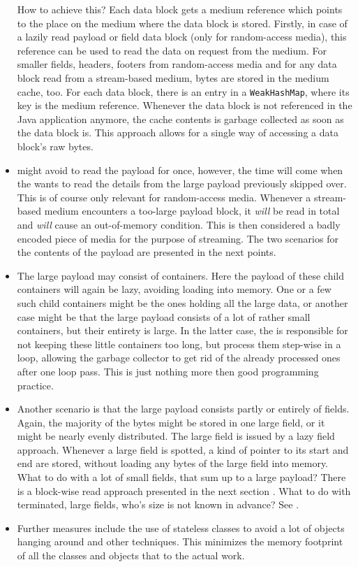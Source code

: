 \begin{itemize}
	How to achieve this? Each data block gets a medium reference which points to the place on the medium where the data block is stored. Firstly, in case of a lazily read payload or field data block (only for random-access media), this reference can be used to read the data on \ACTORuser{} request from the medium. For smaller fields, headers, footers from random-access media and for any data block read from a stream-based medium, bytes are stored in the medium cache, too. For each data block, there is an entry in a \texttt{WeakHashMap}, where its key is the medium reference. Whenever the data block is not referenced in the Java application anymore, the cache contents is garbage collected as soon as the data block is. This approach allows for a single way of accessing a data block's raw bytes.
	\item \LibName{} might avoid to read the payload for once, however, the time will come when the \ACTORuser{} wants to read the details from the large payload previously skipped over. This is of course only relevant for random-access media. Whenever a stream-based medium encounters a too-large payload block, it \emph{will} be read in total and \emph{will} cause an out-of-memory condition. This is then considered a badly encoded piece of media for the purpose of streaming. The two scenarios for the contents of the payload are presented in the next points.
	\item The large payload may consist of containers. Here the payload of these child containers will again be lazy, avoiding loading into memory. One or a few such child containers might be the ones holding all the large data, or another case might be that the large payload consists of a lot of rather small containers, but their entirety is large. In the latter case, the \ACTORuser{} is responsible for not keeping these little containers too long, but process them step-wise in a loop, allowing the garbage collector to get rid of the already processed ones after one loop pass. This is just nothing more then good programming practice. 
	\item Another scenario is that the large payload consists partly or entirely of fields. Again, the majority of the bytes might be stored in one large field, or it might be nearly evenly distributed. The large field is issued by a lazy field approach. Whenever a large field is spotted, a kind of pointer to its start and end are stored, without loading any bytes of the large field into memory. What to do with a lot of small fields, that sum up to a large payload? There is a block-wise read approach presented in the next section . What to do with terminated, large fields, who's size is not known in advance? See .
	\item Further measures include the use of stateless classes to avoid a lot of objects hanging around and other techniques. This minimizes the memory footprint of all the \LibName{} classes and objects that to the actual work.
\end{itemize}

